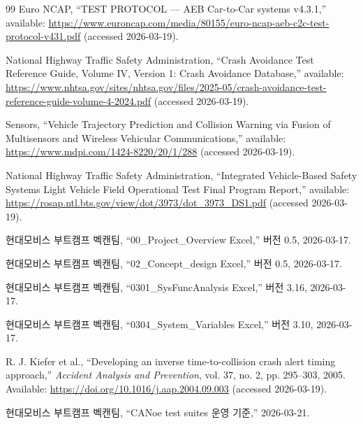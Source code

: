\documentclass[10pt,a4paper,twocolumn]{article}
\begin{document}
\begin{thebibliography}{99}
Euro NCAP, ``TEST PROTOCOL --- AEB Car-to-Car systems v4.3.1,'' available: \url{https://www.euroncap.com/media/80155/euro-ncap-aeb-c2c-test-protocol-v431.pdf} (accessed 2026-03-19).

National Highway Traffic Safety Administration, ``Crash Avoidance Test Reference Guide, Volume IV, Version 1: Crash Avoidance Database,'' available: \url{https://www.nhtsa.gov/sites/nhtsa.gov/files/2025-05/crash-avoidance-test-reference-guide-volume-4-2024.pdf} (accessed 2026-03-19).

Sensors, ``Vehicle Trajectory Prediction and Collision Warning via Fusion of Multisensors and Wireless Vehicular Communications,'' available: \url{https://www.mdpi.com/1424-8220/20/1/288} (accessed 2026-03-19).

National Highway Traffic Safety Administration, ``Integrated Vehicle-Based Safety Systems Light Vehicle Field Operational Test Final Program Report,'' available: \url{https://rosap.ntl.bts.gov/view/dot/3973/dot_3973_DS1.pdf} (accessed 2026-03-19).

현대모비스 부트캠프 벡캔팀, ``00\_Project\_Overview Excel,'' 버전 0.5, 2026-03-17.

현대모비스 부트캠프 벡캔팀, ``02\_Concept\_design Excel,'' 버전 0.5, 2026-03-17.

현대모비스 부트캠프 벡캔팀, ``0301\_SysFuncAnalysis Excel,'' 버전 3.16, 2026-03-17.

현대모비스 부트캠프 벡캔팀, ``0304\_System\_Variables Excel,'' 버전 3.10, 2026-03-17.

R. J. Kiefer et al., ``Developing an inverse time-to-collision crash alert timing approach,'' \emph{Accident Analysis and Prevention}, vol. 37, no. 2, pp. 295--303, 2005. Available: \url{https://doi.org/10.1016/j.aap.2004.09.003} (accessed 2026-03-19).

현대모비스 부트캠프 벡캔팀, ``CANoe test suites 운영 기준,'' 2026-03-21.

\end{thebibliography}
\end{document}
